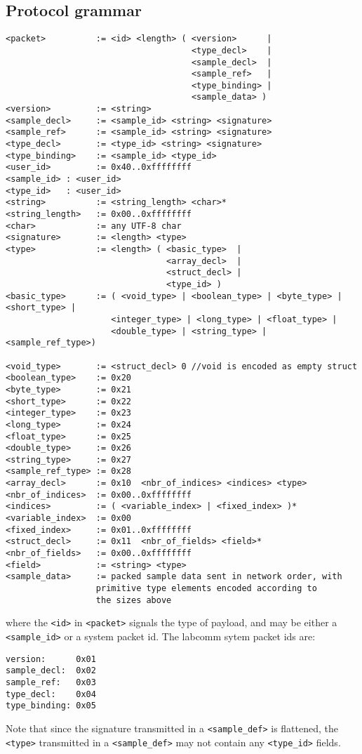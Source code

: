 \documentclass[a4paper]{article}
\begin{document}
\subsection{Protocol grammar}
\label{sec:ConcreteGrammar}
\begin{lstlisting}[basicstyle=\footnotesize\ttfamily]
<packet>          := <id> <length> ( <version>      | 
                                     <type_decl>    | 
                                     <sample_decl>  |
                                     <sample_ref>   |
                                     <type_binding> |
                                     <sample_data> )
<version>         := <string>
<sample_decl>     := <sample_id> <string> <signature>
<sample_ref>      := <sample_id> <string> <signature>
<type_decl>       := <type_id> <string> <signature>
<type_binding>    := <sample_id> <type_id>
<user_id>         := 0x40..0xffffffff  
<sample_id> : <user_id>
<type_id>   : <user_id>
<string>          := <string_length> <char>*
<string_length>   := 0x00..0xffffffff  
<char>            := any UTF-8 char
<signature>       := <length> <type>
<type>            := <length> ( <basic_type>  | 
                                <array_decl>  | 
                                <struct_decl> | 
                                <type_id> )
<basic_type>      := ( <void_type> | <boolean_type> | <byte_type> | <short_type> |
                     <integer_type> | <long_type> | <float_type> |
                     <double_type> | <string_type> | <sample_ref_type>)

<void_type>       := <struct_decl> 0 //void is encoded as empty struct
<boolean_type>    := 0x20 
<byte_type>       := 0x21 
<short_type>      := 0x22 
<integer_type>    := 0x23 
<long_type>       := 0x24 
<float_type>      := 0x25 
<double_type>     := 0x26 
<string_type>     := 0x27 
<sample_ref_type> := 0x28 
<array_decl>      := 0x10  <nbr_of_indices> <indices> <type>
<nbr_of_indices>  := 0x00..0xffffffff  
<indices>         := ( <variable_index> | <fixed_index> )*
<variable_index>  := 0x00  
<fixed_index>     := 0x01..0xffffffff  
<struct_decl>     := 0x11  <nbr_of_fields> <field>*
<nbr_of_fields>   := 0x00..0xffffffff  
<field>           := <string> <type>
<sample_data>     := packed sample data sent in network order, with
                  primitive type elements encoded according to
                  the sizes above
\end{lstlisting}
where the \verb+<id>+ in \verb+<packet>+ signals the type of payload,
and may be either a \verb+<sample_id>+ or a system packet id.
The labcomm sytem packet ids are:
\begin{lstlisting}[basicstyle=\footnotesize\ttfamily]
version:      0x01 
sample_decl:  0x02 
sample_ref:   0x03 
type_decl:    0x04 
type_binding: 0x05          
\end{lstlisting}
Note that since the signature transmitted in a \verb+<sample_def>+ is
flattened, the \verb+<type>+ transmitted in a \verb+<sample_def>+ may
not contain any \verb+<type_id>+ fields.
\end{document}
